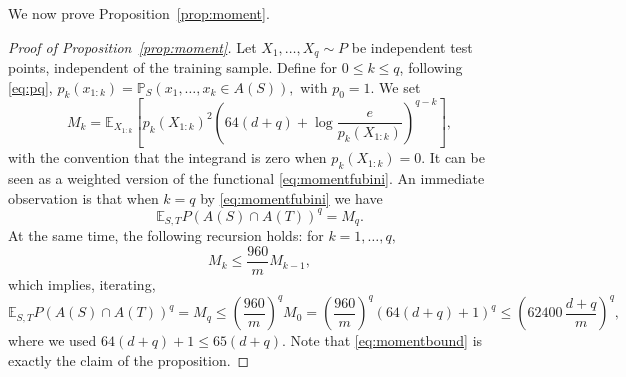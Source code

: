\documentclass[11pt]{article}
\newcommand{\E}{\mathbb E}
\newcommand{\Prb}{\mathbb P}
\newcommand{\1}{\mathbf 1}
\theoremstyle{plain}
\theoremstyle{remark}
\begin{document}
We now prove Proposition~\ref{prop:moment}. 

\begin{proof}[Proof of Proposition~\ref{prop:moment}]
Let $X_1,\ldots,X_q\sim P$ be independent test points, independent of the training sample.  Define for $0\le k\le q$, following \eqref{eq:pq},
$
p_k(x_{1:k})=\Prb_S(x_1,\ldots,x_k\in A(S)),
$
with $p_0=1$. We set 
\[
M_k
=
\E_{X_{1:k}}\left[
p_k(X_{1:k})^2
\left(64(d+q)+\log\frac e{p_k(X_{1:k})}\right)^{q-k}
\right],
\]
with the convention that the integrand is zero when $p_k(X_{1:k}) = 0$. It can be seen as a weighted version of the functional \eqref{eq:momentfubini}. An immediate observation is that when $k = q$ by \eqref{eq:momentfubini} we have
\[
\E_{S,T}P(A(S)\cap A(T))^q = M_q.
\]
At the same time, the following recursion holds: for $k=1,\ldots,q,$
\begin{equation}
\label{eq:onestepcontraction}
M_k\le \frac{960}{m}M_{k-1},
\end{equation}
which implies, iterating,
\begin{equation}
\label{eq:momentbound}
\E_{S,T}P(A(S)\cap A(T))^q  = M_q
\le
\left(\frac{960}{m}\right)^q M_0
=
\left(\frac{960}{m}\right)^q
\left(64(d+q)+1\right)^q
\le
\left(62400\,\frac{d+q}{m}\right)^q,
\end{equation}
where we used $64(d+q)+1\le65(d+q)$. Note that \eqref{eq:momentbound} is exactly the claim of the proposition.


\end{proof}
\end{document}
